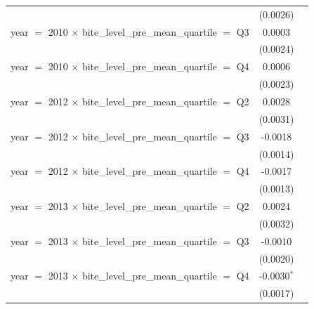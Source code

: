 \begin{tabular}{lcc}
                                                                              & (0.0026)                 &   \\   
   year $=$ 2010 $\times$ bite\_level\_pre\_mean\_quartile $=$ Q3             & 0.0003                   &   \\   
                                                                              & (0.0024)                 &   \\   
   year $=$ 2010 $\times$ bite\_level\_pre\_mean\_quartile $=$ Q4             & 0.0006                   &   \\   
                                                                              & (0.0023)                 &   \\   
   year $=$ 2012 $\times$ bite\_level\_pre\_mean\_quartile $=$ Q2             & 0.0028                   &   \\   
                                                                              & (0.0031)                 &   \\   
   year $=$ 2012 $\times$ bite\_level\_pre\_mean\_quartile $=$ Q3             & -0.0018                  &   \\   
                                                                              & (0.0014)                 &   \\   
   year $=$ 2012 $\times$ bite\_level\_pre\_mean\_quartile $=$ Q4             & -0.0017                  &   \\   
                                                                              & (0.0013)                 &   \\   
   year $=$ 2013 $\times$ bite\_level\_pre\_mean\_quartile $=$ Q2             & 0.0024                   &   \\   
                                                                              & (0.0032)                 &   \\   
   year $=$ 2013 $\times$ bite\_level\_pre\_mean\_quartile $=$ Q3             & -0.0010                  &   \\   
                                                                              & (0.0020)                 &   \\   
   year $=$ 2013 $\times$ bite\_level\_pre\_mean\_quartile $=$ Q4             & -0.0030$^{*}$            &   \\   
                                                                              & (0.0017)                 &   \\   

\end{tabular}
